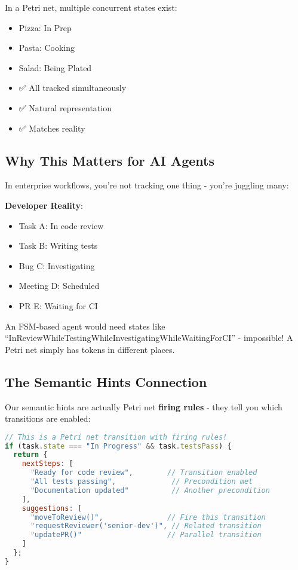 \documentclass[11pt,a4paper]{article}
\begin{document}
In a Petri net, multiple concurrent states exist:
\begin{itemize}
\item Pizza: In Prep
\item Pasta: Cooking
\item Salad: Being Plated
\item ✅ All tracked simultaneously
\item ✅ Natural representation
\item ✅ Matches reality
\end{itemize}

\subsection{Why This Matters for AI Agents}

In enterprise workflows, you're not tracking one thing - you're juggling many:

\textbf{Developer Reality}:
\begin{itemize}
\item Task A: In code review
\item Task B: Writing tests
\item Bug C: Investigating
\item Meeting D: Scheduled
\item PR E: Waiting for CI
\end{itemize}

An FSM-based agent would need states like ``InReviewWhileTestingWhileInvestigatingWhileWaitingForCI'' - impossible! A Petri net simply has tokens in different places.

\subsection{The Semantic Hints Connection}

Our semantic hints are actually Petri net \textbf{firing rules} - they tell you which transitions are enabled:

\begin{lstlisting}[language=JavaScript]
// This is a Petri net transition with firing rules!
if (task.state === "In Progress" && task.testsPass) {
  return {
    nextSteps: [
      "Ready for code review",        // Transition enabled
      "All tests passing",             // Precondition met
      "Documentation updated"          // Another precondition
    ],
    suggestions: [
      "moveToReview()",               // Fire this transition
      "requestReviewer('senior-dev')", // Related transition
      "updatePR()"                    // Parallel transition
    ]
  };
}
\end{lstlisting}
\end{document}
